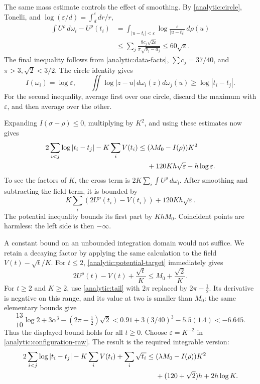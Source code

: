 The same mass estimate controls the effect of smoothing.
By \eqref{analytic:circle}, Tonelli, and
\(\log(\varepsilon/d)=\int_d^\varepsilon dr/r\),
\begin{align*}
 \int U^\rho\,d\omega_i-U^\rho(t_i)
 &=\int_{|u-t_i|<\varepsilon}
                  \log\frac{\varepsilon}{|u-t_i|}\,d\rho(u)\\
 &\leq \sum_j\frac{8c_j\sqrt{2\varepsilon}}
                         {\pi\sqrt{b_j-a_j}}
 \leq60\sqrt\varepsilon.
\end{align*}
The final inequality follows from \eqref{analytic:data-facts},
\(\sum c_j=37/40\), and \(\pi>3,\sqrt2<3/2\).
The circle identity gives
\[
 I(\omega_i)=\log\varepsilon,\qquad
 \iint\log|z-u|\,d\omega_i(z)d\omega_j(u)
       \geq\log|t_i-t_j|.
\]
For the second inequality, average first over one circle, discard the
maximum with \(\varepsilon\), and then average over the other.

Expanding \(I(\sigma-\rho)\leq0\), multiplying by \(K^2\), and using
these estimates now gives
\begin{align}
 2\sum_{i<j}\log|t_i-t_j|-K\sum_iV(t_i)
 \leq{}&(\lambda M_0-I(\rho))K^2\notag\\
       &+120Kh\sqrt\varepsilon-h\log\varepsilon.
 \label{analytic:configuration-raw}
\end{align}
To see the factors of \(K\), the cross term is
\(2K\sum_i\int U^\rho\,d\omega_i\).
After smoothing and subtracting the field term, it is bounded by
\[
 K\sum_i(2U^\rho(t_i)-V(t_i))+120Kh\sqrt\varepsilon.
\]
The potential inequality bounds its first part by \(KhM_0\).
Coincident points are harmless: the left side is then \(-\infty\).

A constant bound on an unbounded integration domain would not suffice.
We retain a decaying factor by applying the same calculation to the
field \(V(t)-\sqrt t/K\).
For \(t\leq2\), \eqref{analytic:potential-target} immediately gives
\[
 2U^\rho(t)-V(t)+\frac{\sqrt t}{K}
       \leq M_0+\frac{\sqrt2}{K}.
\]
For \(t\geq2\) and \(K\geq2\), use \eqref{analytic:tail} with
\(2\pi\) replaced by \(2\pi-\frac12\).
Its derivative is negative on this range, and its value at two is
smaller than \(M_0\): the same elementary bounds give
\[
 \frac{13}{10}\log2+3\alpha^3
       -(2\pi-\tfrac12)\sqrt2
 <0.91+3(3/40)^3-5.5(1.4)<-6.645.
\]
Thus the displayed bound holds for all \(t\geq0\).
Choose \(\varepsilon=K^{-2}\) in
\eqref{analytic:configuration-raw}. The result is the required
integrable version:
\begin{align}
 2\sum_{i<j}\log|t_i-t_j|-K\sum_iV(t_i)+\sum_i\sqrt{t_i}
 \leq{}&(\lambda M_0-I(\rho))K^2\notag\\
       &+(120+\sqrt2)h+2h\log K.
 \label{analytic:configuration}
\end{align}

